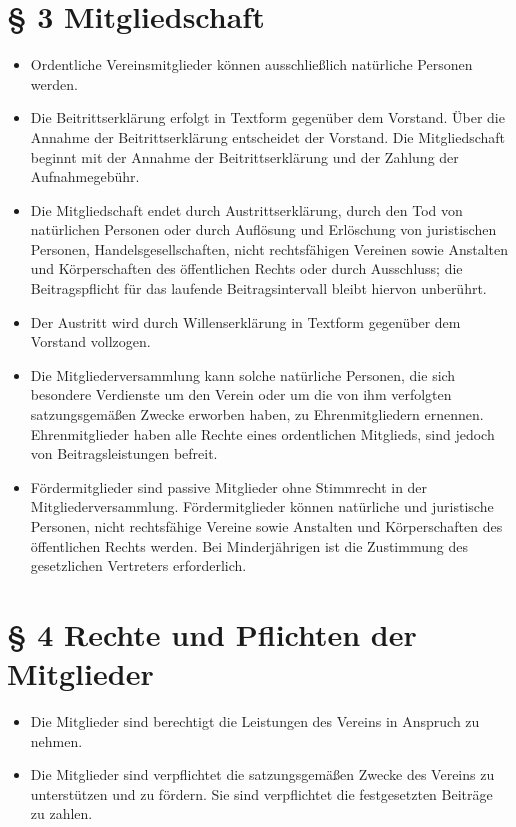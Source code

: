 \documentclass[12pt,paper=a4,ngerman]{scrreprt}
\begin{document}
\section{\S{} 3 Mitgliedschaft}

\begin{itemize}
\item[(1)]
Ordentliche Vereinsmitglieder können ausschließlich natürliche
Personen werden.
\item[(2)]
Die Beitrittserklärung erfolgt in Textform gegenüber dem Vorstand.
Über die Annahme der Beitrittserklärung entscheidet der Vorstand. Die
Mitgliedschaft beginnt mit der Annahme der Beitrittserklärung und der
Zahlung der Aufnahmegebühr.
\item[(3)]
Die Mitgliedschaft endet durch Austrittserklärung, durch den Tod von
natürlichen Personen oder durch Auflösung und Erlöschung von
juristischen Personen, Handelsgesellschaften, nicht rechtsfähigen
Vereinen sowie Anstalten und Körperschaften des öffentlichen Rechts
oder durch Ausschluss; die Beitragspflicht für das laufende
Beitragsintervall bleibt hiervon unberührt.
\item[(4)]
Der Austritt wird durch Willenserklärung in Textform gegenüber dem
Vorstand vollzogen.
\item[(5)]
Die Mitgliederversammlung kann solche natürliche Personen, die sich
besondere Verdienste um den Verein oder um die von ihm verfolgten
satzungsgemäßen Zwecke erworben haben, zu Ehrenmitgliedern ernennen.
Ehrenmitglieder haben alle Rechte eines ordentlichen Mitglieds, sind
jedoch von Beitragsleistungen befreit.
\item[(6)]
Fördermitglieder sind passive Mitglieder ohne Stimmrecht in der
Mitgliederversammlung. Fördermitglieder können natürliche und
juristische Personen, nicht rechtsfähige Vereine sowie Anstalten und
Körperschaften des öffentlichen Rechts werden. Bei Minderjährigen ist
die Zustimmung des gesetzlichen Vertreters erforderlich.
\end{itemize}

\section{\S{} 4 Rechte und Pflichten der Mitglieder}

\begin{itemize}
\item[(1)]
Die Mitglieder sind berechtigt die Leistungen des Vereins in Anspruch
zu nehmen.
\item[(2)]
Die Mitglieder sind verpflichtet die satzungsgemäßen Zwecke des
Vereins zu unterstützen und zu fördern. Sie sind verpflichtet die
festgesetzten Beiträge zu zahlen.
\end{itemize}
\end{document}
